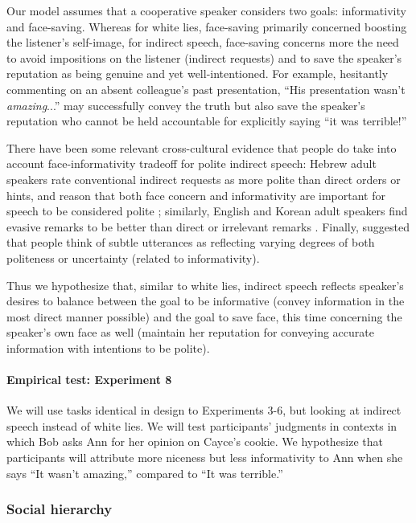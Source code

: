 Our model assumes that a cooperative speaker considers two goals: informativity and face-saving. 
Whereas for white lies, face-saving primarily concerned boosting the listener's self-image, 
for indirect speech, face-saving concerns more the need to avoid impositions on the listener (indirect requests) and to save the speaker's reputation \citep{franke2016} as being genuine and yet well-intentioned. 
For example, hesitantly commenting on an absent colleague's past presentation, ``His presentation wasn't \emph{amazing}...'' may successfully convey the truth but also save the speaker's reputation who cannot be held accountable for explicitly saying ``it was terrible!'' 

There have been some relevant cross-cultural evidence that people do take into account face-informativity tradeoff for polite indirect speech: 
Hebrew adult speakers rate conventional indirect requests as more polite than direct orders or hints, and reason that both face concern and informativity are important for speech to be considered polite \citep{blumkulka1987}; 
similarly, English and Korean adult speakers find evasive remarks to be better than direct or irrelevant remarks \citep{holtgraves1990}.
Finally, \citet{holtgraves2016} suggested that people think of subtle utterances as reflecting varying degrees of both politeness or uncertainty (related to informativity). 

Thus we hypothesize that, similar to white lies, indirect speech reflects speaker's desires to balance between the goal to be informative (convey information in the most direct manner possible) and the goal to save face, this time concerning the speaker's own face as well (maintain her reputation for conveying accurate information with intentions to be polite).

\paragraph{Empirical test: Experiment 8} We will use tasks identical in design to Experiments 3-6, but looking at indirect speech instead of white lies. We will test participants' judgments in contexts in which Bob asks Ann for her opinion on Cayce's cookie. We hypothesize that participants will attribute more niceness but less informativity to Ann when she says ``It wasn't amazing,'' compared to ``It was terrible.''

\subsubsection{Social hierarchy}

